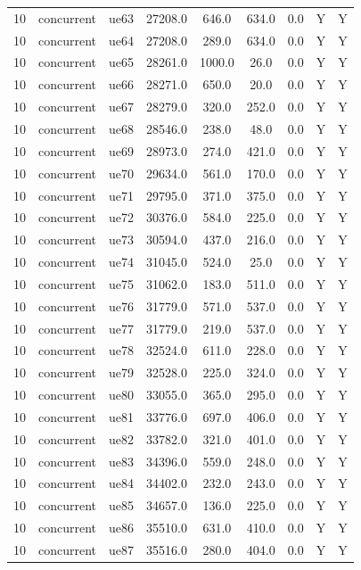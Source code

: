 \begin{table}[ht]
\begin{tabular}{|c|c|c|c|c|c|c|c|c|}
10 & concurrent & ue63 & 27208.0 & 646.0 & 634.0 & 0.0 & Y & Y \\
10 & concurrent & ue64 & 27208.0 & 289.0 & 634.0 & 0.0 & Y & Y \\
10 & concurrent & ue65 & 28261.0 & 1000.0 & 26.0 & 0.0 & Y & Y \\
10 & concurrent & ue66 & 28271.0 & 650.0 & 20.0 & 0.0 & Y & Y \\
10 & concurrent & ue67 & 28279.0 & 320.0 & 252.0 & 0.0 & Y & Y \\
10 & concurrent & ue68 & 28546.0 & 238.0 & 48.0 & 0.0 & Y & Y \\
10 & concurrent & ue69 & 28973.0 & 274.0 & 421.0 & 0.0 & Y & Y \\
10 & concurrent & ue70 & 29634.0 & 561.0 & 170.0 & 0.0 & Y & Y \\
10 & concurrent & ue71 & 29795.0 & 371.0 & 375.0 & 0.0 & Y & Y \\
10 & concurrent & ue72 & 30376.0 & 584.0 & 225.0 & 0.0 & Y & Y \\
10 & concurrent & ue73 & 30594.0 & 437.0 & 216.0 & 0.0 & Y & Y \\
10 & concurrent & ue74 & 31045.0 & 524.0 & 25.0 & 0.0 & Y & Y \\
10 & concurrent & ue75 & 31062.0 & 183.0 & 511.0 & 0.0 & Y & Y \\
10 & concurrent & ue76 & 31779.0 & 571.0 & 537.0 & 0.0 & Y & Y \\
10 & concurrent & ue77 & 31779.0 & 219.0 & 537.0 & 0.0 & Y & Y \\
10 & concurrent & ue78 & 32524.0 & 611.0 & 228.0 & 0.0 & Y & Y \\
10 & concurrent & ue79 & 32528.0 & 225.0 & 324.0 & 0.0 & Y & Y \\
10 & concurrent & ue80 & 33055.0 & 365.0 & 295.0 & 0.0 & Y & Y \\
10 & concurrent & ue81 & 33776.0 & 697.0 & 406.0 & 0.0 & Y & Y \\
10 & concurrent & ue82 & 33782.0 & 321.0 & 401.0 & 0.0 & Y & Y \\
10 & concurrent & ue83 & 34396.0 & 559.0 & 248.0 & 0.0 & Y & Y \\
10 & concurrent & ue84 & 34402.0 & 232.0 & 243.0 & 0.0 & Y & Y \\
10 & concurrent & ue85 & 34657.0 & 136.0 & 225.0 & 0.0 & Y & Y \\
10 & concurrent & ue86 & 35510.0 & 631.0 & 410.0 & 0.0 & Y & Y \\
10 & concurrent & ue87 & 35516.0 & 280.0 & 404.0 & 0.0 & Y & Y \\

\end{tabular}
\end{table}
